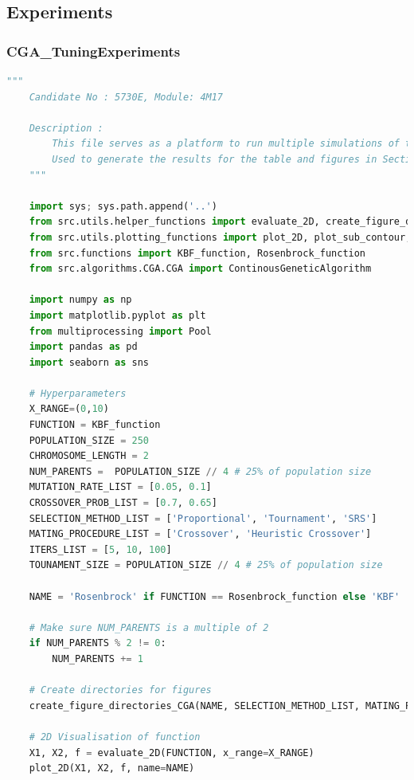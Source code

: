 \documentclass[10pt]{article}
\begin{document}
\subsection{Experiments}
\label{sec:experiments}
\subsubsection{CGA\_TuningExperiments}
\label{sec:CGA_TuningExperiments}
\begin{lstlisting}[language=Python, caption=CGA\_TuningExperiments.py, label=CGA_TuningExperimentspy]
    """
    Candidate No : 5730E, Module: 4M17 
    
    Description :
        This file serves as a platform to run multiple simulations of the CGA algorithm.
        Used to generate the results for the table and figures in Section 3.2 of the report.                     
    """
    
    import sys; sys.path.append('..')
    from src.utils.helper_functions import evaluate_2D, create_figure_directories_CGA
    from src.utils.plotting_functions import plot_2D, plot_sub_contour, plot_population, plot_fitness
    from src.functions import KBF_function, Rosenbrock_function
    from src.algorithms.CGA.CGA import ContinousGeneticAlgorithm
    
    import numpy as np
    import matplotlib.pyplot as plt
    from multiprocessing import Pool
    import pandas as pd
    import seaborn as sns
    
    # Hyperparameters
    X_RANGE=(0,10)
    FUNCTION = KBF_function
    POPULATION_SIZE = 250
    CHROMOSOME_LENGTH = 2
    NUM_PARENTS =  POPULATION_SIZE // 4 # 25% of population size
    MUTATION_RATE_LIST = [0.05, 0.1]
    CROSSOVER_PROB_LIST = [0.7, 0.65]
    SELECTION_METHOD_LIST = ['Proportional', 'Tournament', 'SRS']
    MATING_PROCEDURE_LIST = ['Crossover', 'Heuristic Crossover']
    ITERS_LIST = [5, 10, 100]
    TOUNAMENT_SIZE = POPULATION_SIZE // 4 # 25% of population size
    
    NAME = 'Rosenbrock' if FUNCTION == Rosenbrock_function else 'KBF'
    
    # Make sure NUM_PARENTS is a multiple of 2
    if NUM_PARENTS % 2 != 0:
        NUM_PARENTS += 1
    
    # Create directories for figures
    create_figure_directories_CGA(NAME, SELECTION_METHOD_LIST, MATING_PROCEDURE_LIST, ITERS_LIST)
    
    # 2D Visualisation of function
    X1, X2, f = evaluate_2D(FUNCTION, x_range=X_RANGE)
    plot_2D(X1, X2, f, name=NAME)
    

\end{lstlisting}
\end{document}
